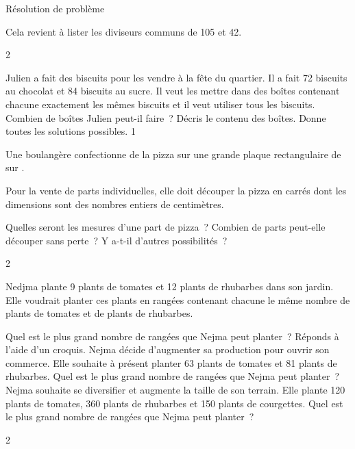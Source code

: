 \documentclass[a4paper,12pt]{report}
\begin{document}
\begin{resolu}{Résolution de problème}
{{    Cela revient à lister les diviseurs communs de 105 et 42.

}

}{2}\end{resolu}





\begin{exo}{ %
    Julien a fait des biscuits pour les vendre à la fête du quartier. Il a fait 72 biscuits au chocolat et 84 biscuits au sucre. Il veut les mettre dans des boîtes contenant chacune exactement les mêmes biscuits et il veut utiliser tous les biscuits. \\
    Combien de boîtes Julien peut-il faire~? Décris le contenu des boîtes.    Donne toutes les solutions possibles.
}{1}\end{exo}



\begin{exo}{
		Une boulangère confectionne de la pizza sur une grande plaque rectangulaire de  sur .

    Pour la vente de parts individuelles, elle doit découper la pizza en carrés dont les dimensions sont des nombres entiers de centimètres. 
    \begin{tasks}
        \task Quelles seront les mesures d'une part de pizza~?
        \task Combien de parts peut-elle découper sans perte~?
        \task Y a-t-il d'autres possibilités~?
    \end{tasks}
}{2}\end{exo}



\begin{exo}{
    Nedjma plante 9 plants de tomates et 12 plants de rhubarbes dans son jardin. \\ Elle voudrait planter ces plants en rangées contenant chacune le même nombre de plants de tomates et de plants de rhubarbes.
    \begin{tasks}
        \task Quel est le plus grand nombre de rangées que Nejma peut planter~? Réponds à l'aide d'un croquis.
        \task Nejma décide d'augmenter sa production pour ouvrir son commerce. Elle souhaite à présent planter 63 plants de tomates et 81 plants de rhubarbes. Quel est le plus grand nombre de rangées que Nejma peut planter~?
        \task Nejma souhaite se diversifier et augmente la taille de son terrain. Elle plante 120 plants de tomates, 360 plants de rhubarbes et 150 plants de courgettes. Quel est le plus grand nombre de rangées que Nejma peut planter~?
    \end{tasks}
}{2}\end{exo}
\end{document}
